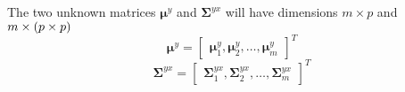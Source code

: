 The two unknown matrices $\boldsymbol{\mu}^y$ and $\mathbf{\Sigma}^{yx}$ will have dimensions $m\times p$ and $m \times \left(p\times p\right)$ 
\begin{equation}
	\label{eq:v_matrix}
	\boldsymbol{\mu}^y = 
	\begin{bmatrix}
		\boldsymbol{\mu}^y_1, \boldsymbol{\mu}^y_2, \dotsc, \boldsymbol{\mu}^y_m
	\end{bmatrix}^T
\end{equation}
\begin{equation}
	\label{gamma_matrix}
	\mathbf{\Sigma}^{yx} = 
	\begin{bmatrix}
		\mathbf{\Sigma}_1^{yx}, \mathbf{\Sigma}_2^{yx}, \dotsc, \mathbf{\Sigma}_m^{yx}
	\end{bmatrix}^T
\end{equation}

